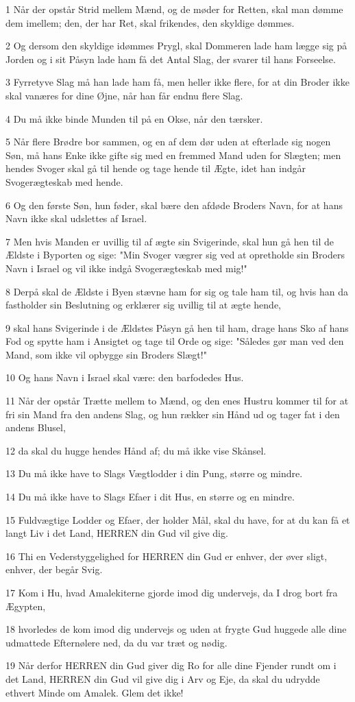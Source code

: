 \par 1 Når der opstår Strid mellem Mænd, og de møder for Retten, skal man dømme dem imellem; den, der har Ret, skal frikendes, den skyldige dømmes.
\par 2 Og dersom den skyldige idømmes Prygl, skal Dommeren lade ham lægge sig på Jorden og i sit Påsyn lade ham få det Antal Slag, der svarer til hans Forseelse.
\par 3 Fyrretyve Slag må han lade ham få, men heller ikke flere, for at din Broder ikke skal vanæres for dine Øjne, når han får endnu flere Slag.
\par 4 Du må ikke binde Munden til på en Okse, når den tærsker.
\par 5 Når flere Brødre bor sammen, og en af dem dør uden at efterlade sig nogen Søn, må hans Enke ikke gifte sig med en fremmed Mand uden for Slægten; men hendes Svoger skal gå til hende og tage hende til Ægte, idet han indgår Svogerægteskab med hende.
\par 6 Og den første Søn, hun føder, skal bære den afdøde Broders Navn, for at hans Navn ikke skal udslettes af Israel.
\par 7 Men hvis Manden er uvillig til af ægte sin Svigerinde, skal hun gå hen til de Ældste i Byporten og sige: "Min Svoger vægrer sig ved at opretholde sin Broders Navn i Israel og vil ikke indgå Svogerægteskab med mig!"
\par 8 Derpå skal de Ældste i Byen stævne ham for sig og tale ham til, og hvis han da fastholder sin Beslutning og erklærer sig uvillig til at ægte hende,
\par 9 skal hans Svigerinde i de Ældstes Påsyn gå hen til ham, drage hans Sko af hans Fod og spytte ham i Ansigtet og tage til Orde og sige: "Således gør man ved den Mand, som ikke vil opbygge sin Broders Slægt!"
\par 10 Og hans Navn i Israel skal være: den barfodedes Hus.
\par 11 Når der opstår Trætte mellem to Mænd, og den enes Hustru kommer til for at fri sin Mand fra den andens Slag, og hun rækker sin Hånd ud og tager fat i den andens Blusel,
\par 12 da skal du hugge hendes Hånd af; du må ikke vise Skånsel.
\par 13 Du må ikke have to Slags Vægtlodder i din Pung, større og mindre.
\par 14 Du må ikke have to Slags Efaer i dit Hus, en større og en mindre.
\par 15 Fuldvægtige Lodder og Efaer, der holder Mål, skal du have, for at du kan få et langt Liv i det Land, HERREN din Gud vil give dig.
\par 16 Thi en Vederstyggelighed for HERREN din Gud er enhver, der øver sligt, enhver, der begår Svig.
\par 17 Kom i Hu, hvad Amalekiterne gjorde imod dig undervejs, da I drog bort fra Ægypten,
\par 18 hvorledes de kom imod dig undervejs og uden at frygte Gud huggede alle dine udmattede Efternølere ned, da du var træt og nødig.
\par 19 Når derfor HERREN din Gud giver dig Ro for alle dine Fjender rundt om i det Land, HERREN din Gud vil give dig i Arv og Eje, da skal du udrydde ethvert Minde om Amalek. Glem det ikke!

